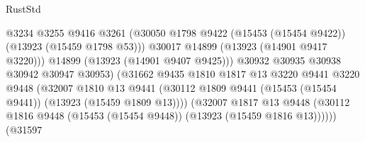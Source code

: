 \begin{lexlean}{RustStd}
\begin{coremodule}
                                              @3234
                                              @3255
                                              @9416
                                              @3261
                                              (@30050
                                                @1798
                                                @9422
                                                (@15453 (@15454 @9422))
                                                (@13923 (@15459 @1798 @53)))
                                              @30017
                                              @14899
                                              (@13923 (@14901 @9417 @3220)))
                                            @14899
                                            (@13923 (@14901 @9407 @9425)))
                                          @30932
                                          @30935
                                          @30938
                                          @30942
                                          @30947
                                          @30953)
                                        (@31662
                                          @9435
                                          @1810
                                          @1817
                                          @13
                                          @3220
                                          @9441
                                          @3220
                                          @9448
                                          (@32007
                                            @1810
                                            @13
                                            @9441
                                            (@30112
                                              @1809
                                              @9441
                                              (@15453 (@15454 @9441))
                                              (@13923 (@15459 @1809 @13))))
                                          (@32007
                                            @1817
                                            @13
                                            @9448
                                            (@30112
                                              @1816
                                              @9448
                                              (@15453 (@15454 @9448))
                                              (@13923 (@15459 @1816 @13))))))
                                      (@31597

\end{coremodule}
\end{lexlean}
